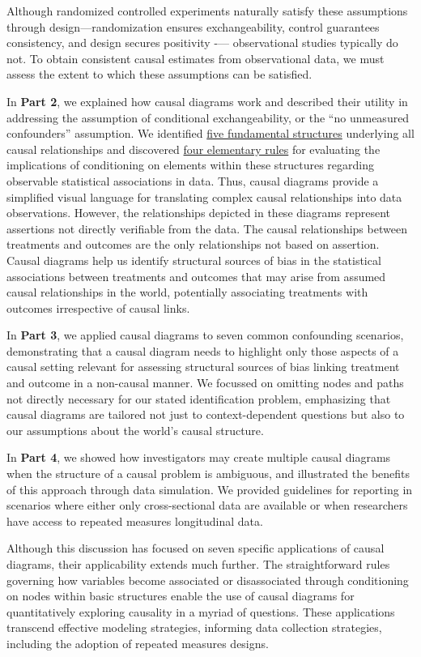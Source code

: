 \documentclass[
  singlecolumn]{article}
\begin{document}
Although randomized controlled experiments naturally satisfy these
assumptions through design---randomization ensures exchangeability,
control guarantees consistency, and design secures positivity -\/---
observational studies typically do not. To obtain consistent causal
estimates from observational data, we must assess the extent to which
these assumptions can be satisfied.

In \textbf{Part 2}, we explained how causal diagrams work and described
their utility in addressing the assumption of conditional
exchangeability, or the ``no unmeasured confounders'' assumption. We
identified \hyperref[sec-five-elementary]{five fundamental structures}
underlying all causal relationships and discovered
\hyperref[sec-four-rules]{four elementary rules} for evaluating the
implications of conditioning on elements within these structures
regarding observable statistical associations in data. Thus, causal
diagrams provide a simplified visual language for translating complex
causal relationships into data observations. However, the relationships
depicted in these diagrams represent assertions not directly verifiable
from the data. The causal relationships between treatments and outcomes
are the only relationships not based on assertion. Causal diagrams help
us identify structural sources of bias in the statistical associations
between treatments and outcomes that may arise from assumed causal
relationships in the world, potentially associating treatments with
outcomes irrespective of causal links.

In \textbf{Part 3}, we applied causal diagrams to seven common
confounding scenarios, demonstrating that a causal diagram needs to
highlight only those aspects of a causal setting relevant for assessing
structural sources of bias linking treatment and outcome in a non-causal
manner. We focussed on omitting nodes and paths not directly necessary
for our stated identification problem, emphasizing that causal diagrams
are tailored not just to context-dependent questions but also to our
assumptions about the world's causal structure.

In \textbf{Part 4}, we showed how investigators may create multiple
causal diagrams when the structure of a causal problem is ambiguous, and
illustrated the benefits of this approach through data simulation. We
provided guidelines for reporting in scenarios where either only
cross-sectional data are available or when researchers have access to
repeated measures longitudinal data.

Although this discussion has focused on seven specific applications of
causal diagrams, their applicability extends much further. The
straightforward rules governing how variables become associated or
disassociated through conditioning on nodes within basic structures
enable the use of causal diagrams for quantitatively exploring causality
in a myriad of questions. These applications transcend effective
modeling strategies, informing data collection strategies, including the
adoption of repeated measures designs.
\end{document}
